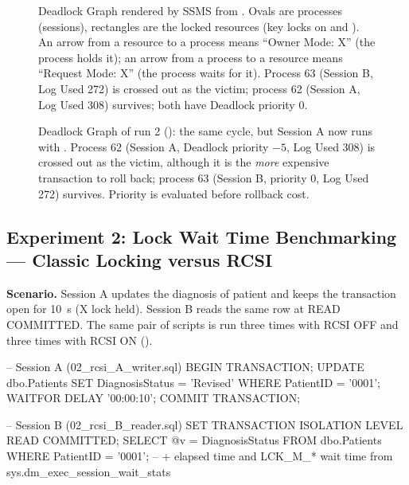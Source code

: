 \begin{figure}[H]
  \centering
  \caption{Deadlock Graph rendered by SSMS from . Ovals are processes (sessions), rectangles are the locked resources (key locks on  and ). An arrow from a resource to a process means ``Owner Mode: X'' (the process holds it); an arrow from a process to a resource means ``Request Mode: X'' (the process waits for it). Process 63 (Session B, Log Used 272) is crossed out as the victim; process 62 (Session A, Log Used 308) survives; both have Deadlock priority 0.}
  \label{fig:r5-deadlock-ssms}
\end{figure}

\begin{figure}[H]
  \centering
  \caption{Deadlock Graph of run 2 (): the same cycle, but Session A now runs with . Process 62 (Session A, Deadlock priority $-5$, Log Used 308) is crossed out as the victim, although it is the \emph{more} expensive transaction to roll back; process 63 (Session B, priority 0, Log Used 272) survives. Priority is evaluated before rollback cost.}
  \label{fig:r5-deadlock-ssms-run2}
\end{figure}

\subsection{Experiment 2: Lock Wait Time Benchmarking --- Classic Locking versus RCSI}
\label{sec:r5-2-rcsi}

\textbf{Scenario.} Session A updates the diagnosis of patient  and keeps the transaction open for 10~s (X lock held). Session B reads the same row at READ COMMITTED. The same pair of scripts is run three times with RCSI OFF and three times with RCSI ON ().

\begin{SQLCode}
-- Session A (02_rcsi_A_writer.sql)
BEGIN TRANSACTION;
    UPDATE dbo.Patients SET DiagnosisStatus = 'Revised' WHERE PatientID = '0001';
    WAITFOR DELAY '00:00:10';
COMMIT TRANSACTION;

-- Session B (02_rcsi_B_reader.sql)
SET TRANSACTION ISOLATION LEVEL READ COMMITTED;
SELECT @v = DiagnosisStatus FROM dbo.Patients WHERE PatientID = '0001';
-- + elapsed time and LCK_M_* wait time from sys.dm_exec_session_wait_stats
\end{SQLCode}

